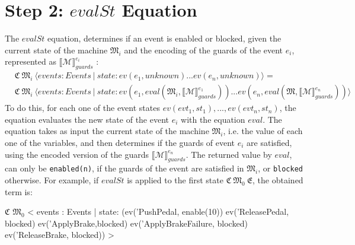 \section{Step 2: $evalSt$ Equation}
The $evalSt$ equation, determines if an event is enabled or blocked, given the current state of the machine $\mathfrak{M}_i$ and the encoding of the guards of the event $e_i$, represented as $\llbracket \mathscr{M} \rrbracket^{e_i}_{guards}$ :
\begin{align*}
    &\mathfrak{C} \ \mathfrak{M}_{i} \ \langle events : Events \ | \ state: ev(e_1,unknown) ... ev(e_n, unknown) \rangle = \\
    &\mathfrak{C} \ \mathfrak{M}_{i} \ \langle events : Events \ | \ state: ev(e_1, eval(\mathfrak{M}_i, \llbracket \mathscr{M} \rrbracket^{e_1}_{guards})) ... ev(e_n, eval(\mathfrak{M}, \llbracket \mathscr{M} \rrbracket^{e_n}_{guards})) \rangle
\end{align*}
To do this, for each one of the event states $ev(evt_1,st_1), ..., ev(evt_n,st_n)$, the equation evaluates the new state of the event $e_i$ with the equation $eval$. The equation takes as input the current state of the machine $\mathfrak{M}_i$, i.e. the value of each one of the variables, and then determines if the guards of event $e_i$ are satisfied, using the encoded version of the guards  $\llbracket \mathscr{M} \rrbracket^{e_n}_{guards}$. The returned value by $eval$, can only be \texttt{enabled(n)}, if the guards of the event are satisfied in $\mathfrak{M}_i$, or \texttt{blocked} otherwise. For example, if $evalSt$ is applied to the first state $\mathfrak{C} \ \mathfrak{M}_{0}  \ \mathfrak{E}$, the obtained term is:
\begin{maude}

$\mathfrak{C}$ $\mathfrak{M}_0$ < events : Events | state: (ev('PushPedal, enable(10)) 
                                 ev('ReleasePedal, blocked) 
                                 ev('ApplyBrake,blocked) 
                                 ev('ApplyBrakeFailure, blocked)
                                 ev('ReleaseBrake, blocked)) >
\end{maude}



